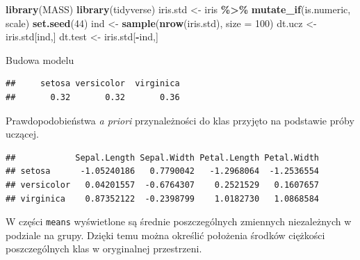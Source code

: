 \documentclass[
]{book}
\newenvironment{Shaded}{\begin{snugshade}}{\end{snugshade}}
\newcommand{\AttributeTok}[1]{\textcolor[rgb]{0.13,0.29,0.53}{#1}}
\newcommand{\DecValTok}[1]{\textcolor[rgb]{0.00,0.00,0.81}{#1}}
\newcommand{\FunctionTok}[1]{\textcolor[rgb]{0.13,0.29,0.53}{\textbf{#1}}}
\newcommand{\NormalTok}[1]{#1}
\newcommand{\OtherTok}[1]{\textcolor[rgb]{0.56,0.35,0.01}{#1}}
\newcommand{\SpecialCharTok}[1]{\textcolor[rgb]{0.81,0.36,0.00}{\textbf{#1}}}
\theoremstyle{plain}
\theoremstyle{definition}
\theoremstyle{definition}
\theoremstyle{definition}
\theoremstyle{definition}
\theoremstyle{definition}
\theoremstyle{remark}
\begin{document}
\begin{Shaded}
\begin{Highlighting}[]
\FunctionTok{library}\NormalTok{(MASS)}
\FunctionTok{library}\NormalTok{(tidyverse)}
\NormalTok{iris.std }\OtherTok{\textless{}{-}}\NormalTok{ iris }\SpecialCharTok{\%\textgreater{}\%} 
    \FunctionTok{mutate\_if}\NormalTok{(is.numeric, scale)}
\FunctionTok{set.seed}\NormalTok{(}\DecValTok{44}\NormalTok{)}
\NormalTok{ind }\OtherTok{\textless{}{-}} \FunctionTok{sample}\NormalTok{(}\FunctionTok{nrow}\NormalTok{(iris.std), }\AttributeTok{size =} \DecValTok{100}\NormalTok{)}
\NormalTok{dt.ucz }\OtherTok{\textless{}{-}}\NormalTok{ iris.std[ind,]}
\NormalTok{dt.test }\OtherTok{\textless{}{-}}\NormalTok{ iris.std[}\SpecialCharTok{{-}}\NormalTok{ind,]}
\end{Highlighting}
\end{Shaded}

Budowa modelu

\begin{Shaded}
\end{Shaded}

\begin{verbatim}
##     setosa versicolor  virginica 
##       0.32       0.32       0.36
\end{verbatim}

Prawdopodobieństwa \emph{a priori} przynależności do klas przyjęto na podstawie próby uczącej.

\begin{Shaded}
\end{Shaded}

\begin{verbatim}
##            Sepal.Length Sepal.Width Petal.Length Petal.Width
## setosa      -1.05240186   0.7790042   -1.2968064  -1.2536554
## versicolor   0.04201557  -0.6764307    0.2521529   0.1607657
## virginica    0.87352122  -0.2398799    1.0182730   1.0868584
\end{verbatim}

W części \texttt{means} wyświetlone są średnie poszczególnych zmiennych niezależnych w podziale na grupy. Dzięki temu można określić położenia środków ciężkości poszczególnych klas w oryginalnej przestrzeni.
\end{document}
